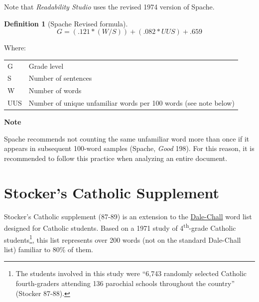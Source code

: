 \documentclass[
]{book}
\newenvironment{notesection}
    {
    \begin{tcolorbox}[colframe=mediumblue,colback=lightblue,coltext=mediumblue,arc=3mm]
    \faLightbulb[regular] \textbf{Note} \newline
    }
    {
    \end{tcolorbox}
    }
\theoremstyle{definition}
\newtheorem{definition}{Definition}[chapter]
\theoremstyle{definition}
\theoremstyle{definition}
\theoremstyle{definition}
\theoremstyle{remark}
\begin{document}
Note that \emph{Readability Studio} uses the revised 1974 version of Spache.

\begin{definition}[Spache Revised formula]
\protect\hypertarget{def:spacherevised}{}{\label{def:spacherevised} {} }\[
G = (.121 * (W/S)) + (.082 * UUS) + .659
\]
\end{definition}

Where:

\begin{longtable}[]{@{}
  >{\raggedright\arraybackslash}p{}
  >{\raggedright\arraybackslash}p{}@{}}
\toprule
\endhead
G & Grade level \\
S & Number of sentences \\
W & Number of words \\
UUS & Number of unique unfamiliar words per 100 words (see note below) \\
\bottomrule
\end{longtable}

\begin{notesection}
Spache recommends not counting the same unfamiliar word more than once if it appears in subsequent 100-word samples (Spache, \emph{Good} 198). For this reason, it is recommended to follow this practice when analyzing an entire document.

\end{notesection}


\newpage

\hypertarget{stocker-catholic-supplement}{%
\section{\texorpdfstring{Stocker's Catholic Supplement}{Stocker's Catholic Supplement}}\label{stocker-catholic-supplement}}

Stocker's Catholic supplement (87-89) is an extension to the \protect\hyperlink{dale-chall-test}{Dale-Chall} word list designed for Catholic students. Based on a 1971 study of 4\textsuperscript{th}-grade Catholic students\footnote{The students involved in this study were ``6,743 randomly selected Catholic fourth-graders attending 136 parochial schools throughout the country'' (Stocker 87-88).}, this list represents over 200 words (not on the standard Dale-Chall list) familiar to 80\% of them.
\end{document}
